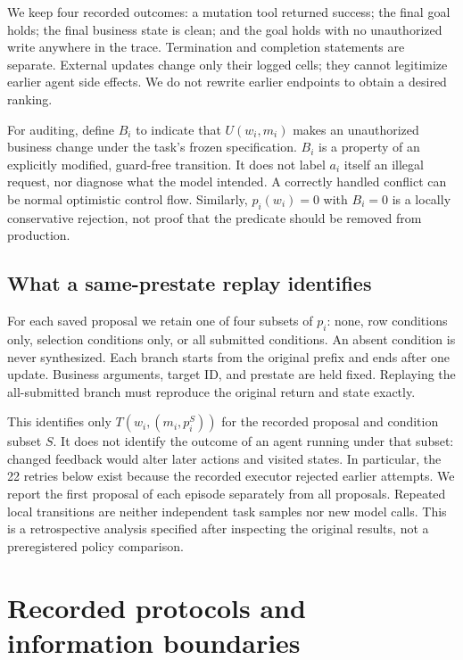 \documentclass[10pt,letterpaper]{article}
\begin{document}
We keep four recorded outcomes: a mutation tool returned success; the final goal holds; the final business state is clean; and the goal holds with no unauthorized write anywhere in the trace. Termination and completion statements are separate. External updates change only their logged cells; they cannot legitimize earlier agent side effects. We do not rewrite earlier endpoints to obtain a desired ranking.

For auditing, define $B_i$ to indicate that $U(w_i,m_i)$ makes an unauthorized business change under the task's frozen specification. $B_i$ is a property of an explicitly modified, guard-free transition. It does not label $a_i$ itself an illegal request, nor diagnose what the model intended. A correctly handled conflict can be normal optimistic control flow. Similarly, $p_i(w_i)=0$ with $B_i=0$ is a locally conservative rejection, not proof that the predicate should be removed from production.

\subsection{What a same-prestate replay identifies}
For each saved proposal we retain one of four subsets of $p_i$: none, row conditions only, selection conditions only, or all submitted conditions. An absent condition is never synthesized. Each branch starts from the original prefix and ends after one update. Business arguments, target ID, and prestate are held fixed. Replaying the all-submitted branch must reproduce the original return and state exactly.

This identifies only $T(w_i,(m_i,p_i^S))$ for the recorded proposal and condition subset $S$. It does not identify the outcome of an agent running under that subset: changed feedback would alter later actions and visited states. In particular, the 22 retries below exist because the recorded executor rejected earlier attempts. We report the first proposal of each episode separately from all proposals. Repeated local transitions are neither independent task samples nor new model calls. This is a retrospective analysis specified after inspecting the original results, not a preregistered policy comparison.

\section{Recorded protocols and information boundaries}
\end{document}
